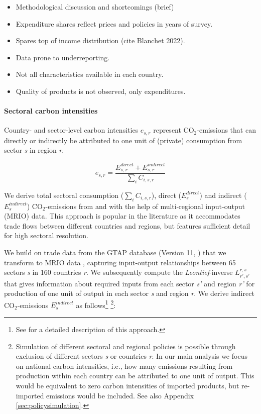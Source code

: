 \documentclass[12pt, a4paper]{article}
\begin{document}
\begin{itemize}
    \item Methodological discussion and shortcomings (brief)
    \item Expenditure shares reflect prices and policies in years of survey. 
    \item Spares top of income distribution (cite Blanchet 2022).
    \item Data prone to underreporting.
    \item Not all characteristics available in each country.
    \item Quality of products is not observed, only expenditures. 
\end{itemize}


\paragraph{Sectoral carbon intensities} Country- and sector-level carbon intensities $e_{s,r}$ represent CO$_{2}$-emissions that can directly or indirectly be attributed to one unit of (private) consumption from sector \textit{s} in region \textit{r}.

\begin{equation}
    e_{s,r} = \frac{E_{s,r}^{direct}+E_{s,r}^{indirect}}{\sum_{i} C_{i,s,r}}
\end{equation}

We derive total sectoral consumption ($\sum_{i} C_{i,s,r}$), direct ($E_{s}^{direct}$) and indirect ($E_{s}^{indirect}$) CO$_{2}$-emissions from and with the help of multi-regional input-output (MRIO) data. This approach is popular in the literature as it accommodates trade flows between different countries and regions, but features sufficient detail for high sectoral resolution. 

We build on trade data from the GTAP database (Version 11,  \textcite{Aguiar.2022}) that we transform to MRIO data \autocite{Peters.2011}, capturing input-output relationships between 65 sectors \textit{s} in 160 countries \textit{r}. We subsequently compute the \textit{Leontief}-inverse $L_{r',s'}^{r,s}$ that gives information about required inputs from each sector \textit{s'} and region \textit{r'} for production of one unit of output in each sector \textit{s} and region \textit{r}. We derive indirect CO$_{2}$-emissions $E_{s}^{indirect}$ as follows\footnote{See \textcite{Missbach.2023b, Steckel.2021b,Feindt.2021,VogtSchilb.2019} for a detailed description of this approach.} \footnote{Simulation of different sectoral and regional policies is possible through exclusion of different sectors \textit{s} or countries \textit{r}. In our main analysis we focus on national carbon intensities, i.e., how many emissions resulting from production within each country can be attributed to one unit of output. This would be equivalent to zero carbon intensities of imported products, but re-imported emissions would be included. See also Appendix \ref{sec:policysimulation}.}:
\end{document}
